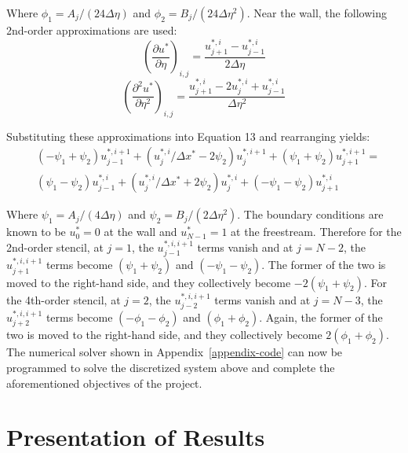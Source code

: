 \documentclass[letterpaper,12pt]{article}
\begin{document}
Where $\phi_1 = A_j/(24 \Delta \eta)$ and $\phi_2 = B_j/(24 \Delta \eta^2)$. Near the wall, the following 2nd-order approximations are used:
\begin{equation}
    \left( \frac{\partial u^{*}}{\partial \eta} \right)_{i,j} = \frac{u_{j+1}^{*,i} -  u_{j-1}^{*,i}}{2 \Delta \eta}
\end{equation}
\begin{equation}
    \left( \frac{\partial^2 u^{*}}{\partial \eta^2} \right)_{i,j} = \frac{u_{j+1}^{*,i} - 2 u_{j}^{*,i} + u_{j-1}^{*,i}}{\Delta \eta^2}
\end{equation}

Substituting these approximations into Equation 13 and rearranging yields:
\begin{equation}
\begin{aligned}
    &(-\psi_1 + \psi_2)u_{j-1}^{*,i+1} + (u_{j}^{*,i} / \Delta x^* - 2 \psi_2)u_{j}^{*,i+1} + (\psi_1 + \psi_2)u_{j+1}^{*,i+1} = \\
    &(\psi_1 - \psi_2)u_{j-1}^{*,i} + (u_{j}^{*,i} / \Delta x^* + 2 \psi_2)u_{j}^{*,i} + (-\psi_1 - \psi_2)u_{j+1}^{*,i}
\end{aligned}
\end{equation}

Where $\psi_1 = A_j/(4 \Delta \eta)$ and $\psi_2 = B_j/(2 \Delta \eta^2)$. The boundary conditions are known to be $u^{*}_0=0$ at the wall and $u^{*}_{N-1}=1$ at the freestream. Therefore for the 2nd-order stencil, at $j=1$, the $u_{j-1}^{*,i,i+1}$ terms vanish and at $j=N-2$, the $u_{j+1}^{*,i,i+1}$ terms become $(\psi_1 + \psi_2)$ and $(-\psi_1 - \psi_2)$. The former of the two is moved to the right-hand side, and they collectively become $-2(\psi_1 + \psi_2)$. For the 4th-order stencil, at $j=2$, the $u_{j-2}^{*,i,i+1}$ terms vanish and at $j=N-3$, the $u_{j+2}^{*,i,i+1}$ terms become $(-\phi_1 - \phi_2)$ and $(\phi_1 + \phi_2)$. Again, the former of the two is moved to the right-hand side, and they collectively become $2(\phi_1 + \phi_2)$. The numerical solver shown in Appendix~\ref{appendix-code} can now be programmed to solve the discretized system above and complete the aforementioned objectives of the project.


\section{Presentation of Results}
\end{document}
